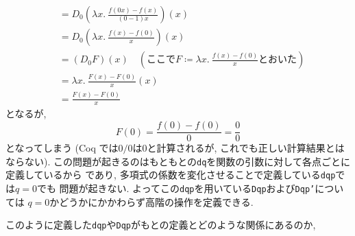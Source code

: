 \documentclass[11pt]{jarticle}
\theoremstyle{mystyle}
\newtheorem{rmk}[df]{$\textrm{Remark}$}
\newcommand{\brmk}{\begin{rmk}}
\newcommand{\ermk}{\end{rmk}}
\newcommand{\0}{\textbf{0}}
\newcommand{\1}{\textbf{1}}
\newcommand{\2}{\textbf{2}}
\begin{document}
\begin{enumerate}
\begin{align*}
	                    &= D_0 \left( \lambda x.\ \frac{f (0 x) - f(x)}{(0 - 1)x} \right) (x) \\
	                    &= D_0 \left( \lambda x.\ \frac{f(x) - f(0)}{x} \right) (x) \\
	                    &= (D_0 F) (x)
	                      \quad (\text{ここで}F \coloneqq \lambda x.\ \frac{f(x) - f(0)}{x}
	                                \text{とおいた})\\
	                    &= \lambda x.\ \frac{F(x) - F(0)}{x} (x) \\
	                    &= \frac{F(x) - F(0)}{x}
	\end{align*}
	となるが, 
	\[
	  F(0) = \frac{f(0) - f(0)}{0} = \frac{0}{0}
	\]
	となってしまう
	(Coq では$0/0$は$0$と計算されるが, これでも正しい計算結果とはならない).
	この問題が起きるのはもともとの{\tt dq}を関数の引数に対して各点ごとに定義しているから
	であり, 多項式の係数を変化させることで定義している{\tt dqp}では$q = 0$でも
	問題が起きない. よってこの{\tt dqp}を用いている{\tt Dqp}および{\tt Dqp'}については
	$q = 0$かどうかにかかわらず高階の操作を定義できる. 
\end{enumerate}
このように定義した{\tt dqp}や{\tt Dqp}がもとの定義とどのような関係にあるのか,
\end{document}
